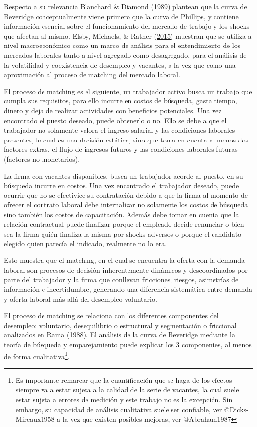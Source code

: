 \documentclass[12pt,twoside]{reedthesis}
\begin{document}
Respecto a su relevancia Blanchard \& Diamond (\protect\hyperlink{ref-Blanchard1989}{1989}) plantean que la curva de Beveridge conceptualmente viene primero que la curva de Phillips, y contiene información esencial sobre el funcionamiento del mercado de trabajo y los shocks que afectan al mismo. Elsby, Michaels, \& Ratner (\protect\hyperlink{ref-Elsby2015}{2015}) muestran que se utiliza a nivel macroeconómico como un marco de análisis para el entendimiento de los mercados laborales tanto a nivel agregado como desagregado, para el análisis de la volatilidad y coexistencia de desempleo y vacantes, a la vez que como una aproximación al proceso de matching del mercado laboral.

El proceso de matching es el siguiente, un trabajador activo busca un trabajo que cumpla sus requisitos, para ello incurre en costos de búsqueda, gasta tiempo, dinero y deja de realizar actividades con beneficios potenciales. Una vez encontrado el puesto deseado, puede obtenerlo o no. Ello se debe a que el trabajador no solamente valora el ingreso salarial y las condiciones laborales presentes, lo cual es una decisión estática, sino que toma en cuenta al menos dos factores extras, el flujo de ingresos futuros y las condiciones laborales futuras (factores no monetarios).

La firma con vacantes disponibles, busca un trabajador acorde al puesto, en su búsqueda incurre en costos. Una vez encontrado el trabajador deseado, puede ocurrir que no se efectivice su contratación debido a que la firma al momento de ofrecer el contrato laboral debe internalizar no solamente los costos de búsqueda sino también los costos de capacitación. Además debe tomar en cuenta que la relación contractual puede finalizar porque el empleado decide renunciar o bien sea la firma quién finaliza la misma por shocks adversos o porque el candidato elegido quien parecía el indicado, realmente no lo era.

Esto muestra que el matching, en el cual se encuentra la oferta con la demanda laboral son procesos de decisión inherentemente dinámicos y descoordinados por parte del trabajador y la firma que conllevan fricciones, riesgos, asimetrías de información e incertidumbre, generando una diferencia sistemática entre demanda y oferta laboral más allá del desempleo voluntario.

El proceso de matching se relaciona con los diferentes componentes del desempleo: voluntario, desequilibrio o estructural y segmentación o friccional analizados en Rama (\protect\hyperlink{ref-Rama1988}{1988}).
El análisis de la curva de Beveridge mediante la teoría de búsqueda y emparejamiento puede explicar los 3 componentes, al menos de forma cualitativa\footnote{Es importante remarcar que la cuantificación que se haga de los efectos siempre va a estar sujeta a la calidad de la serie de vacantes, la cual suele estar sujeta a errores de medición y este trabajo no es la excepción. Sin embargo, su capacidad de análisis cualitativa suele ser confiable, ver @Dicks-Mireaux1958 a la vez que existen posibles mejoras, ver @Abraham1987}.
\end{document}
